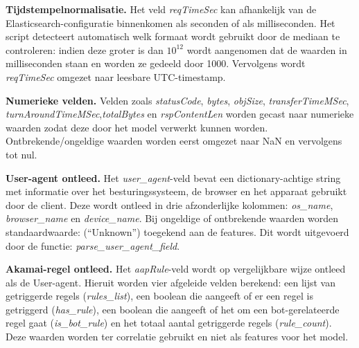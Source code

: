 \textbf{Tijdstempelnormalisatie.} Het veld \textit{reqTimeSec} kan afhankelijk van de Elasticsearch-configuratie binnenkomen als seconden of als milliseconden. Het script detecteert automatisch welk formaat wordt gebruikt door de mediaan te controleren: indien deze groter is dan $10^{12}$ wordt aangenomen dat de waarden in milliseconden staan en worden ze gedeeld door 1000. Vervolgens wordt \textit{reqTimeSec} omgezet naar leesbare UTC-timestamp. 




\textbf{Numerieke velden.} Velden zoals \textit{statusCode}, \textit{bytes}, \textit{objSize}, \textit{transferTimeMSec}, \textit{turnAroundTimeMSec},\textit{totalBytes} en \textit{rspContentLen} worden gecast naar numerieke waarden zodat deze door het model verwerkt kunnen worden. Ontbrekende/ongeldige waarden worden eerst omgezet naar NaN en vervolgens tot nul.

\textbf{User-agent ontleed.} Het \textit{user\_agent}-veld bevat een dictionary-achtige string met informatie over het besturingssysteem, de browser en het apparaat gebruikt door de client. Deze wordt ontleed in drie afzonderlijke kolommen: \textit{os\_name}, \textit{browser\_name} en \textit{device\_name}. Bij ongeldige of ontbrekende waarden worden standaardwaarde: (\enquote{Unknown}) toegekend aan de features. Dit wordt uitgevoerd door de functie: \textit{parse_user_agent_field}.

\textbf{Akamai-regel ontleed.} Het \textit{aapRule}-veld wordt op vergelijkbare wijze ontleed als de User-agent. Hieruit worden vier afgeleide velden berekend: een lijst van getriggerde regels (\textit{rules\_list}), een boolean die aangeeft of er een regel is getriggerd (\textit{has\_rule}), een boolean die aangeeft of het om een bot-gerelateerde regel gaat (\textit{is\_bot\_rule}) en het totaal aantal getriggerde regels (\textit{rule\_count}). Deze waarden worden ter correlatie gebruikt en niet als features voor het model. 

